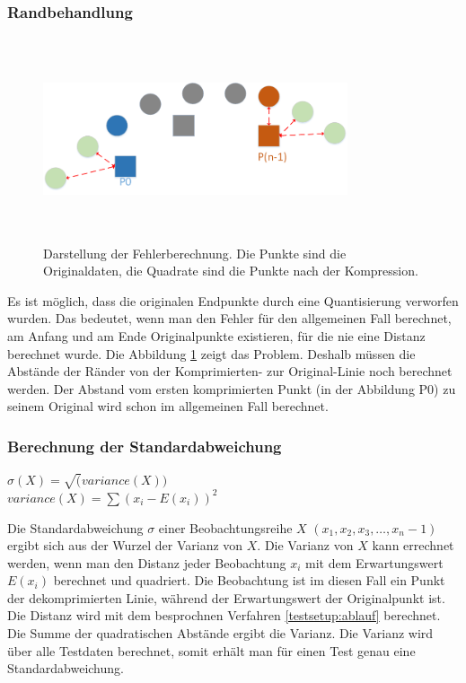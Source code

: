 \subsubsection{Randbehandlung}
\begin{figure}[!htbp]
	\center
	\includegraphics[width=0.8\textwidth,height=6cm,keepaspectratio]{./pictures/testsetup/randbehandlung.png}
	\caption{Darstellung der Fehlerberechnung. Die Punkte sind die Originaldaten, die Quadrate sind die Punkte nach der Kompression.}
	\label{testsetup:ablauf:randbehandlung:diagramm}
\end{figure}
Es ist möglich, dass die originalen Endpunkte durch eine Quantisierung verworfen wurden. Das bedeutet, wenn man den Fehler für den allgemeinen Fall berechnet, am Anfang und am Ende Originalpunkte existieren, für die nie eine Distanz berechnet wurde. Die Abbildung \ref{testsetup:ablauf:randbehandlung:diagramm} zeigt das Problem. Deshalb müssen die Abstände der Ränder von der Komprimierten- zur Original-Linie noch berechnet werden. Der Abstand vom ersten komprimierten Punkt (in der Abbildung P0) zu seinem Original wird schon im allgemeinen Fall berechnet.

\subsubsection{Berechnung der Standardabweichung}
\begin{center}
$\sigma(X) = \sqrt(variance(X))$\\
$variance(X) = \sum{(x_i - E(x_i))^2}$
\end{center}
Die Standardabweichung $\sigma$ einer Beobachtungsreihe $X$ $(x_1,x_2,x_3,\ldots, x_n-1)$ ergibt sich aus der Wurzel der Varianz von $X$. Die Varianz von $X$ kann errechnet werden, wenn man den Distanz jeder Beobachtung $x_i$ mit dem Erwartungswert $E(x_i)$ berechnet und quadriert. Die Beobachtung ist im diesen Fall ein Punkt der dekomprimierten Linie, während der Erwartungswert der Originalpunkt ist. Die Distanz wird mit dem besprochnen Verfahren \ref{testsetup:ablauf} berechnet. Die Summe der quadratischen Abstände ergibt die Varianz. Die Varianz wird über alle Testdaten berechnet, somit erhält man für einen Test genau eine Standardabweichung.

